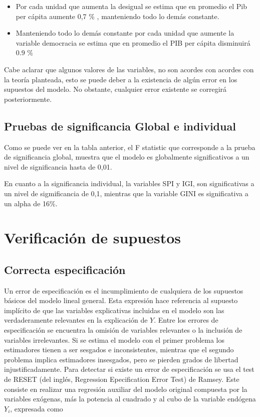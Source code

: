 \documentclass[11pt]{article}
\begin{document}
{\begin{itemize}
    \item Por cada unidad que aumenta la desigual se estima que en promedio el Pib per cápita aumente 0,7 \% , manteniendo todo lo demás constante.
    
    \item Manteniendo todo lo demás constante por cada unidad que aumente la variable democracia se estima que en promedio el PIB per cápita disminuirá 0.9 \% 
\end{itemize}

Cabe aclarar que algunos valores de las variables, no son acordes con acordes con la teoría planteada, esto se puede deber a la existencia de algún error en los supuestos del modelo. No obstante, cualquier error existente se corregirá posteriormente.

\subsection{Pruebas de significancia Global e individual}

Como se puede ver en la tabla anterior, el F statistic que corresponde a la prueba de significancia global, muestra que el modelo es globalmente significativos a un nivel de significancia hasta de 0,01. 

En cuanto a la significancia individual, la variables SPI y IGI, son significativas a un nivel de sigmificancia de 0,1, mientras que la variable GINI es significativa a un alpha de 16\%.




\section{Verificación de supuestos}
\subsection{Correcta especificación}

Un error de especificación es el incumplimiento de cualquiera de los supuestos básicos del modelo lineal general. Esta expresión hace referencia al supuesto implícito de que las variables explicativas incluidas en el modelo son las verdaderamente relevantes en la explicación de $Y$. Entre los errores de especificación se encuentra la omisión de variables relevantes o la inclusión de variables irrelevantes. Si se estima el modelo con el primer problema los estimadores tienen a ser sesgados e inconsistentes, mientras que el segundo problema implica estimadores insesgados, pero se pierden grados de libertad injustificadamente. Para detectar si existe un error de especificación se usa el test de RESET (del inglés, Regression Epecification Error Test) de Ramsey. Este consiste  en realizar una regresión auxiliar del modelo original compuesta por la variables exógenas, más la potencia al cuadrado y al cubo de la variable endógena $Y_i$, expresada como

}
\end{document}
